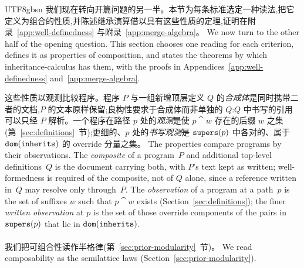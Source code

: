 \begin{CJK*}{UTF8}{gbsn}
\ifPaperChinese
我们现在转向开篇问题的另一半。本节为每条标准选定一种读法,把它定义为组合的性质,并陈述继承演算借以具有这些性质的定理,证明在附录~\ref{app:well-definedness} 与附录~\ref{app:merge-algebra}。
\else
We now turn to the other half of the opening question. This section chooses one reading for
each criterion, defines it as properties of composition, and states the theorems by which
inheritance-calculus has them, with the proofs in Appendices~\ref{app:well-definedness} and~\ref{app:merge-algebra}.
\fi

\ifPaperChinese
这些性质以观测比较程序。程序 $P$ 与一组新增顶层定义 $Q$ 的\emph{合成体}是同时携带二者的文档,$P$ 的文本原样保留;良构性要求于合成体而非单独的 $Q$:$Q$ 中书写的引用可以只经 $P$ 解析。一个程序在路径 $p$ 处的\emph{观测}是使 $p \cat w$ 存在的后缀 $w$ 之集(第~\ref{sec:definitions}~节);更细的、$p$ 处的\emph{书写观测}是 $\mathtt{supers}(p)$ 中各对的、属于 $\mathtt{dom}(\mathtt{inherits})$ 的 override 分量之集。
\else
The properties compare programs by their observations. The \emph{composite} of a program~$P$ and
additional top-level definitions~$Q$ is the document carrying both, with $P$'s text kept as written;
well-formedness is required of the composite, not of $Q$ alone, since a reference written in~$Q$ may
resolve only through~$P$. The \emph{observation} of a program at a path~$p$ is the set of suffixes $w$
such that $p \cat w$ exists (Section~\ref{sec:definitions}); the finer \emph{written observation} at $p$
is the set of those override components of the pairs in $\mathtt{supers}(p)$ that lie in $\mathtt{dom}(\mathtt{inherits})$.
\fi

\paragraph{}
\ifPaperChinese
我们把可组合性读作半格律(第~\ref{sec:prior-modularity}~节)。
\else
We read composability as the semilattice laws (Section~\ref{sec:prior-modularity}).
\fi


\end{CJK*}
